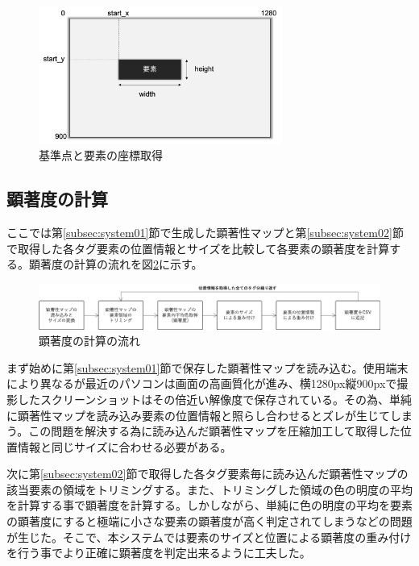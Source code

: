 \begin{figure}[H]
    \centering
    \includegraphics[width=8cm]{figures/getposition.png}
    \caption{基準点と要素の座標取得}
    \label{fig_getposition}
\end{figure}


\subsection{顕著度の計算}\label{subsec:system03}
\par ここでは第\ref{subsec:system01}節で生成した顕著性マップと第\ref{subsec:system02}節で取得した各タグ要素の位置情報とサイズを比較して各要素の顕著度を計算する。顕著度の計算の流れを図\ref{fig_system03}に示す。

\begin{figure}[H]
    \centering
    \includegraphics[width=12cm]{figures/system03.png}
    \caption{顕著度の計算の流れ}
    \label{fig_system03}
\end{figure}

\par まず始めに第\ref{subsec:system01}節で保存した顕著性マップを読み込む。使用端末により異なるが最近のパソコンは画面の高画質化が進み、横1280px縦900pxで撮影したスクリーンショットはその倍近い解像度で保存されている。その為、単純に顕著性マップを読み込み要素の位置情報と照らし合わせるとズレが生じてしまう。この問題を解決する為に読み込んだ顕著性マップを圧縮加工して取得した位置情報と同じサイズに合わせる必要がある。

\par 次に第\ref{subsec:system02}節で取得した各タグ要素毎に読み込んだ顕著性マップの該当要素の領域をトリミングする。また、トリミングした領域の色の明度の平均を計算する事で顕著度を計算する。しかしながら、単純に色の明度の平均を要素の顕著度にすると極端に小さな要素の顕著度が高く判定されてしまうなどの問題が生じた。そこで、本システムでは要素のサイズと位置による顕著度の重み付けを行う事でより正確に顕著度を判定出来るように工夫した。

